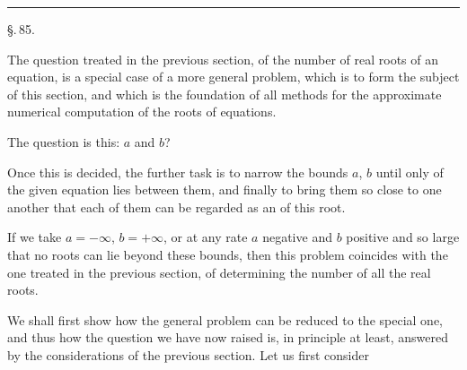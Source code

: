 \begin{center}


\rule{0.3\linewidth}{0.4pt}

\S.\,85.

\end{center}

The question treated in the previous section, of the number of real roots of an equation, is a special case of a more general problem, which is to form the subject of this section, and which is the foundation of all methods for the approximate numerical computation of the roots of equations.

The question is this:  $a$ and $b$?

Once this is decided, the further task is to narrow the bounds $a$, $b$ until only  of the given equation lies between them, and finally to bring them so close to one another that each of them can be regarded as an  of this root.

If we take $a = -\infty$, $b = +\infty$, or at any rate $a$ negative and $b$ positive and so large that no roots can lie beyond these bounds, then this problem coincides with the one treated in the previous section, of determining the number of all the real roots.

We shall first show how the general problem can be reduced to the special one, and thus how the question we have now raised is, in principle at least, answered by the considerations of the previous section. Let us first consider
